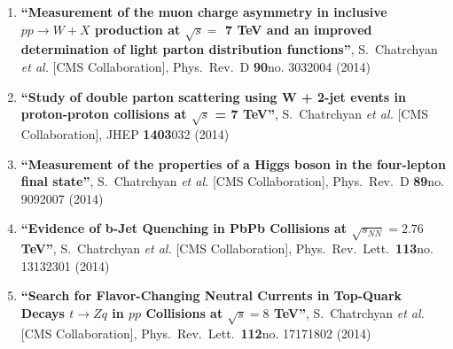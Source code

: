 \begin{enumerate}
\item%
{\bf ``Measurement of the muon charge asymmetry in inclusive $pp \to W+X$ production at $\sqrt s =$ 7 TeV and an improved determination of light parton distribution functions''}, 
  S.~Chatrchyan {\it et al.}  [CMS Collaboration], 
Phys.\ Rev.\ D {\bf 90}no. 3032004 (2014) %


\item%
{\bf ``Study of double parton scattering using W + 2-jet events in proton-proton collisions at $\sqrt{s}$ = 7 TeV''}, 
  S.~Chatrchyan {\it et al.}  [CMS Collaboration], 
JHEP {\bf 1403}032 (2014) %


\item%
{\bf ``Measurement of the properties of a Higgs boson in the four-lepton final state''}, 
  S.~Chatrchyan {\it et al.}  [CMS Collaboration], 
Phys.\ Rev.\ D {\bf 89}no. 9092007 (2014) %


\item%
{\bf ``Evidence of b-Jet Quenching in PbPb Collisions at $\sqrt{s_{NN}}=2.76$ TeV''}, 
  S.~Chatrchyan {\it et al.}  [CMS Collaboration], 
Phys.\ Rev.\ Lett.\  {\bf 113}no. 13132301 (2014) %


\item%
{\bf ``Search for Flavor-Changing Neutral Currents in Top-Quark Decays $t \to Zq$ in $pp$ Collisions at $\sqrt{s}=8$ TeV''}, 
  S.~Chatrchyan {\it et al.}  [CMS Collaboration], 
Phys.\ Rev.\ Lett.\  {\bf 112}no. 17171802 (2014) %



\end{enumerate}
